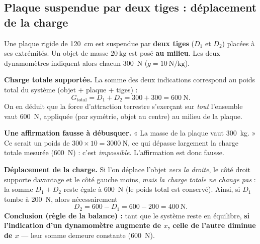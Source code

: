 \documentclass[11pt,a4paper]{article}
\begin{document}
\subsection{Plaque suspendue par deux tiges : déplacement de la charge}
\begin{exemple}
Une plaque rigide de \SI{120}{\centi\metre} est suspendue par \textbf{deux tiges} ($D_1$ et $D_2$)
placées à ses extrémités. Un objet de masse $\SI{20}{\kilogram}$ est posé \textbf{au milieu}. Les deux
dynamomètres indiquent alors chacun \SI{300}{\newton} ($g=\SI{10}{\newton\per\kilogram}$).

\smallskip
\textbf{Charge totale supportée.} La somme des deux indications correspond au poids total du
système (objet + plaque + tiges) :
\[
G_{\text{total}} = D_1 + D_2 = 300 + 300 = \SI{600}{\newton}.
\]
On en déduit que la force d'attraction terrestre s'exerçant sur \emph{tout} l'ensemble vaut
\SI{600}{\newton}, appliquée (par symétrie, objet au centre) au milieu de la plaque.

\textbf{Une affirmation fausse à débusquer.} « La masse de la plaque vaut \SI{300}{\kilogram}. »
Ce serait un poids de $300\times 10 = \SI{3000}{\newton}$, ce qui dépasse largement la charge totale
mesurée (\SI{600}{\newton}) : c'est \emph{impossible}. L'affirmation est donc fausse.

\smallskip
\textbf{Déplacement de la charge.} Si l'on déplace l'objet \emph{vers la droite}, le côté droit
supporte davantage et le côté gauche moins, \emph{mais la charge totale ne change pas} : la somme
$D_1 + D_2$ reste égale à \SI{600}{\newton} (le poids total est conservé). Ainsi, si $D_1$ tombe à
\SI{200}{\newton}, alors nécessairement
\[
D_2 = 600 - D_1 = 600 - 200 = \SI{400}{\newton}.
\]
\textbf{Conclusion (règle de la balance) :} tant que le système reste en équilibre,
\textbf{si l'indication d'un dynamomètre augmente de $x$, celle de l'autre diminue de $x$} —
leur somme demeure constante (\SI{600}{\newton}).
\end{exemple}

\end{document}
